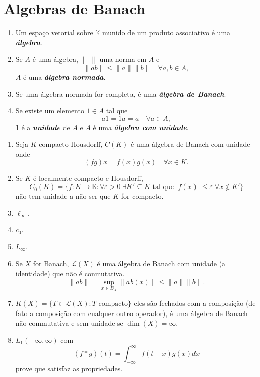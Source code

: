 \documentclass[portuguese]{article}
\theoremstyle{definition}
\begin{document}
\section{Algebras de Banach}
\begin{defn}\leavevmode
	\begin{enumerate}
		\item Um espaço vetorial sobre $\mathbb{K}$ munido de um produto associativo é uma \textbf{\textit{álgebra}}.
		\item Se $A$ é uma álgebra, $\|\;\|$ uma norma em $A$ e
		\[\|ab\|\leq\|a\|\|b\|\quad\forall a,b\in A,\]
		$A$ é uma \textbf{\textit{álgebra normada}}.
		\item Se uma álgebra normada for completa, é uma \textbf{\textit{álgebra de Banach}}.
		\item Se existe um elemento $1\in A$ tal que
		\[a1=1a=a\quad\forall a\in A,\]
		$1$ é a \textbf{\textit{unidade}} de $A$ e $A$ é uma \textbf{\textit{álgebra com unidade}}.
	\end{enumerate}
\end{defn}
\begin{exemplos}[bobos]\leavevmode
	\begin{enumerate}
		\item Seja $K$ compacto Housdorff, $C(K)$ é uma álgebra de Banach com unidade onde
		\[(fg)x=f(x)g(x)\quad\forall x\in K.\]
		\item Se $K$ é localmente compacto e Housdorff,
		\[C_0(K)=\{f:K\to\mathbb{K}:\forall\varepsilon>0\;\exists K'\subseteq K\text{ tal que }|f(x)|\leq\varepsilon\;\forall x\notin K'\}\]
		não tem unidade a não ser que $K$ for compacto.
		\item $\ell_\infty$.
		\item $c_0$.
		\item $L_\infty$.
		\item Se $X$ for Banach, $\mathcal{L}(X)$ é uma álgebra de Banach com unidade (a identidade) que não é conmutativa.
		\[\|ab\|=\sup_{x\in B_X}\|ab(x)\|\leq\|a\|\|b\|.\]
		\item $K(X)=\{T\in\mathcal{L}(X):T\text{ compacto}\}$ {\color{orange} eles são fechados com a composição (de fato a composição com cualquer outro operador)}, é uma álgebra de Banach não commutativa e sem unidade se $\dim(X)=\infty$.
		\item $L_1(-\infty,\infty)$ com
		\[(f\ast g)(t)=\int_{-\infty}^\infty f(t-x)g(x)dx\]
		{\color{orange} prove que satisfaz as propriedades}.
	\end{enumerate}
\end{exemplos}
\end{document}
